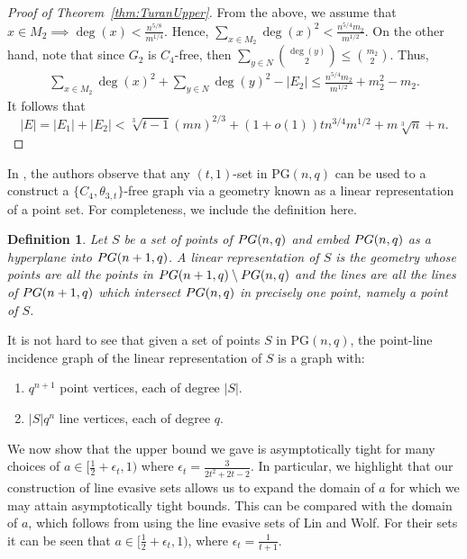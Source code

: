 \documentclass[12pt]{article}
\newtheorem{defn}[thm]{Definition}
\newcommand{\PG}{\text{PG}}
\begin{document}
\begin{proof}[Proof of Theorem~\ref{thm:TuranUpper}]
     From the above, we assume that $x \in M_2 \implies \deg(x) < \frac{n^{5/8}}{m^{1/4}}$. Hence, $\sum_{x \in M_2} \deg(x)^2 < \frac{n^{5/4}m_2}{m^{1/2}}$. On the other hand, note that since $G_2$ is $C_4$-free, then $\sum_{y \in N}\binom{\deg(y)}{2} \leq \binom{m_2}{2}$. Thus,
    \begin{align*}
        \sum_{x \in M_2}\deg(x)^2+ \sum_{y \in N}\deg(y)^2-|E_2| \leq \frac{n^{5/4}m_2}{m^{1/2}} + m_2^2 - m_2.
    \end{align*}
    It follows that  
    $$
    |E| = |E_1| + |E_2| < \sqrt[3]{t-1}(mn)^{2/3} + (1+o(1))tn^{3/4}m^{1/2} + m\sqrt[3]{n}+n.
    $$    
\end{proof}

In \cite{DuzgunRietTaranchuk2025}, the authors observe that any $(t, 1)$-set in $\PG(n, q)$ can be used to a construct a $\{C_4, \theta_{3, t} \}$-free graph via a geometry known as a linear representation of a point set. For completeness, we include the definition here.

\begin{defn}
    Let $S$ be a set of points of $\emph{PG}(n, q)$ and embed $\emph{PG}(n, q)$ as a hyperplane into $\emph{PG}(n+1, q)$. A \emph{linear representation} of $S$ is the geometry whose points are all the points in $\emph{PG}(n+1, q)\setminus \emph{PG}(n, q)$ and the lines are all the lines of $\emph{PG}(n+1, q)$ which intersect $\emph{PG}(n, q)$ in precisely one point, namely a point of $S$. 
\end{defn}

It is not hard to see that given a set of points $S$ in $\PG(n, q)$, the point-line incidence graph of the linear representation of $S$ is a graph with:
\begin{enumerate}
    \item $q^{n+1}$ point vertices, each of degree $|S|$. 
    \item $|S|q^n$ line vertices, each of degree $q$.
\end{enumerate}


 We now show that the upper bound we gave is asymptotically tight for many choices of $a \in [\frac{1}{2} + \epsilon_t, 1)$ where $\epsilon_t = \frac{3}{2t^2 + 2t - 2}$. In particular, we highlight that our construction of line evasive sets allows us to expand the domain of $a$ for which we may attain asymptotically tight bounds. This can be compared with the domain of $a$, which follows from using the line evasive sets of Lin and Wolf. For their sets it can be seen that $a \in [\frac{1}{2} + \epsilon_t, 1)$, where $\epsilon_t = \frac{1}{t+1}$. 
\end{document}
